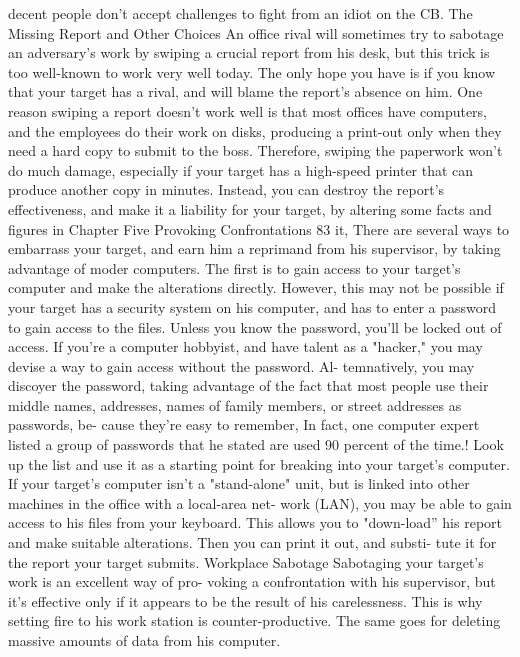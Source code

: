 \documentclass{book}
\begin{document}
decent people don't accept challenges to fight from an idiot on 
the CB. 
The Missing Report 
and Other Choices 
An office rival will sometimes try to sabotage an adversary's 
work by swiping a crucial report from his desk, but this trick is 
too well-known to work very well today. The only hope you 
have is if you know that your target has a rival, and will blame 
the report's absence on him. 
One reason swiping a report doesn't work well is that most 
offices have computers, and the employees do their work on 
disks, producing a print-out only when they need a hard copy to 
submit to the boss. Therefore, swiping the paperwork won't do 
much damage, especially if your target has a high-speed printer 
that can produce another copy in minutes. 
Instead, you can destroy the report's effectiveness, and make 
it a liability for your target, by altering some facts and figures in 
Chapter Five 
Provoking Confrontations 
83 
it, There are several ways to embarrass your target, and earn 
him a reprimand from his supervisor, by taking advantage of 
moder computers. 
The first is to gain access to your target's computer and 
make the alterations directly. However, this may not be possible 
if your target has a security system on his computer, and has to 
enter a password to gain access to the files. Unless you know 
the password, you'll be locked out of access. 
If you're a computer hobbyist, and have talent as a "hacker," 
you may devise a way to gain access without the password. Al- 
temnatively, you may discoyer the password, taking advantage 
of the fact that most people use their middle names, addresses, 
names of family members, or street addresses as passwords, be- 
cause they're easy to remember, In fact, one computer expert 
listed a group of passwords that he stated are used 90 percent of 
the time.! Look up the list and use it as a starting point for 
breaking into your target's computer. 
If your target's computer isn’t a "stand-alone" unit, but is 
linked into other machines in the office with a local-area net- 
work (LAN), you may be able to gain access to his files from 
your keyboard. This allows you to "down-load” his report and 
make suitable alterations. Then you can print it out, and substi- 
tute it for the report your target submits. 
Workplace Sabotage 
Sabotaging your target's work is an excellent way of pro- 
voking a confrontation with his supervisor, but it's effective 
only if it appears to be the result of his carelessness. This is why 
setting fire to his work station is counter-productive. The same 
goes for deleting massive amounts of data from his computer. 
\end{document}
